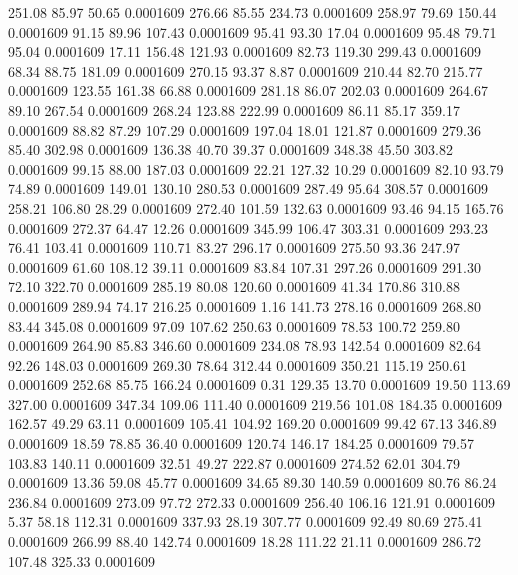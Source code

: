  251.08   85.97   50.65   0.0001609
 276.66   85.55  234.73   0.0001609
 258.97   79.69  150.44   0.0001609
  91.15   89.96  107.43   0.0001609
  95.41   93.30   17.04   0.0001609
  95.48   79.71   95.04   0.0001609
  17.11  156.48  121.93   0.0001609
  82.73  119.30  299.43   0.0001609
  68.34   88.75  181.09   0.0001609
 270.15   93.37    8.87   0.0001609
 210.44   82.70  215.77   0.0001609
 123.55  161.38   66.88   0.0001609
 281.18   86.07  202.03   0.0001609
 264.67   89.10  267.54   0.0001609
 268.24  123.88  222.99   0.0001609
  86.11   85.17  359.17   0.0001609
  88.82   87.29  107.29   0.0001609
 197.04   18.01  121.87   0.0001609
 279.36   85.40  302.98   0.0001609
 136.38   40.70   39.37   0.0001609
 348.38   45.50  303.82   0.0001609
  99.15   88.00  187.03   0.0001609
  22.21  127.32   10.29   0.0001609
  82.10   93.79   74.89   0.0001609
 149.01  130.10  280.53   0.0001609
 287.49   95.64  308.57   0.0001609
 258.21  106.80   28.29   0.0001609
 272.40  101.59  132.63   0.0001609
  93.46   94.15  165.76   0.0001609
 272.37   64.47   12.26   0.0001609
 345.99  106.47  303.31   0.0001609
 293.23   76.41  103.41   0.0001609
 110.71   83.27  296.17   0.0001609
 275.50   93.36  247.97   0.0001609
  61.60  108.12   39.11   0.0001609
  83.84  107.31  297.26   0.0001609
 291.30   72.10  322.70   0.0001609
 285.19   80.08  120.60   0.0001609
  41.34  170.86  310.88   0.0001609
 289.94   74.17  216.25   0.0001609
   1.16  141.73  278.16   0.0001609
 268.80   83.44  345.08   0.0001609
  97.09  107.62  250.63   0.0001609
  78.53  100.72  259.80   0.0001609
 264.90   85.83  346.60   0.0001609
 234.08   78.93  142.54   0.0001609
  82.64   92.26  148.03   0.0001609
 269.30   78.64  312.44   0.0001609
 350.21  115.19  250.61   0.0001609
 252.68   85.75  166.24   0.0001609
   0.31  129.35   13.70   0.0001609
  19.50  113.69  327.00   0.0001609
 347.34  109.06  111.40   0.0001609
 219.56  101.08  184.35   0.0001609
 162.57   49.29   63.11   0.0001609
 105.41  104.92  169.20   0.0001609
  99.42   67.13  346.89   0.0001609
  18.59   78.85   36.40   0.0001609
 120.74  146.17  184.25   0.0001609
  79.57  103.83  140.11   0.0001609
  32.51   49.27  222.87   0.0001609
 274.52   62.01  304.79   0.0001609
  13.36   59.08   45.77   0.0001609
  34.65   89.30  140.59   0.0001609
  80.76   86.24  236.84   0.0001609
 273.09   97.72  272.33   0.0001609
 256.40  106.16  121.91   0.0001609
   5.37   58.18  112.31   0.0001609
 337.93   28.19  307.77   0.0001609
  92.49   80.69  275.41   0.0001609
 266.99   88.40  142.74   0.0001609
  18.28  111.22   21.11   0.0001609
 286.72  107.48  325.33   0.0001609
